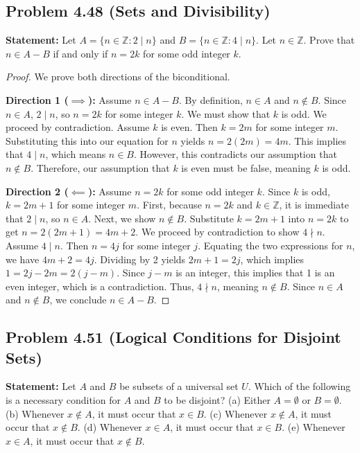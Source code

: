\documentclass[11pt]{article}
\theoremstyle{definition}
\theoremstyle{remark}
\begin{document}
\subsection{Problem 4.48 (Sets and Divisibility)}
\textbf{Statement:} Let $A = \{n \in \mathbb{Z} : 2 \mid n\}$ and $B = \{n \in \mathbb{Z} : 4 \mid n\}$. Let $n \in \mathbb{Z}$. Prove that $n \in A - B$ if and only if $n = 2k$ for some odd integer $k$.

\begin{proof}
We prove both directions of the biconditional.

\textbf{Direction 1 ($\implies$):} Assume $n \in A - B$. By definition, $n \in A$ and $n \notin B$. 
Since $n \in A$, $2 \mid n$, so $n = 2k$ for some integer $k$. 
We must show that $k$ is odd. We proceed by contradiction. Assume $k$ is even. Then $k = 2m$ for some integer $m$. 
Substituting this into our equation for $n$ yields $n = 2(2m) = 4m$. 
This implies that $4 \mid n$, which means $n \in B$. 
However, this contradicts our assumption that $n \notin B$. 
Therefore, our assumption that $k$ is even must be false, meaning $k$ is odd.

\textbf{Direction 2 ($\impliedby$):} Assume $n = 2k$ for some odd integer $k$. 
Since $k$ is odd, $k = 2m + 1$ for some integer $m$. 
First, because $n = 2k$ and $k \in \mathbb{Z}$, it is immediate that $2 \mid n$, so $n \in A$. 
Next, we show $n \notin B$. Substitute $k = 2m + 1$ into $n = 2k$ to get $n = 2(2m + 1) = 4m + 2$. 
We proceed by contradiction to show $4 \nmid n$. Assume $4 \mid n$. Then $n = 4j$ for some integer $j$. 
Equating the two expressions for $n$, we have $4m + 2 = 4j$. 
Dividing by 2 yields $2m + 1 = 2j$, which implies $1 = 2j - 2m = 2(j - m)$. 
Since $j - m$ is an integer, this implies that 1 is an even integer, which is a contradiction. 
Thus, $4 \nmid n$, meaning $n \notin B$. 
Since $n \in A$ and $n \notin B$, we conclude $n \in A - B$.
\end{proof}

\subsection{Problem 4.51 (Logical Conditions for Disjoint Sets)}
\textbf{Statement:} Let $A$ and $B$ be subsets of a universal set $U$. Which of the following is a necessary condition for $A$ and $B$ to be disjoint?
(a) Either $A = \emptyset$ or $B = \emptyset$.
(b) Whenever $x \notin A$, it must occur that $x \in B$.
(c) Whenever $x \notin A$, it must occur that $x \notin B$.
(d) Whenever $x \in A$, it must occur that $x \in B$.
(e) Whenever $x \in A$, it must occur that $x \notin B$.
\end{document}
